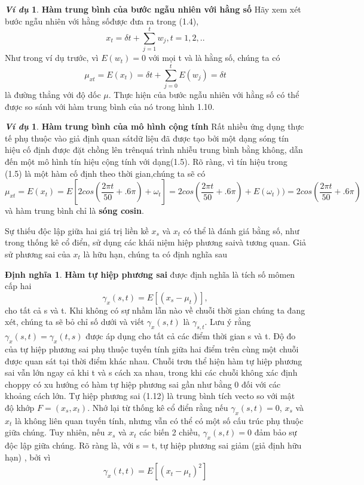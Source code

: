 \documentclass[12pt, a4paper,oneside]{book}
\theoremstyle{definition}
\newtheorem{dn}[theo]{Định nghĩa}
\newtheorem{vd}[theo]{\it Ví dụ}
\begin{document}
\begin{vd}\textbf {Hàm trung bình của bước ngẫu nhiên với hằng số}
	Hãy xem xét bước ngẫu nhiên với hằng sốđược đưa ra trong (1.4),
	$$ x_{t} = \delta t + \sum_{j=1}^{t} w_{j}, t= 1,2,..$$
	Như trong ví dụ trước, vì $E(w_{t}) = 0$ với mọi t và là hằng số, chúng ta có
	$$\mu_{xt} = E(x_{t}) = \delta t + \sum_{j=0}^{t} E (w_{j}) = \delta t$$
	là đường thẳng với độ dốc $\mu$. Thực hiện của bước ngẫu nhiên với hằng số có thể được so sánh với hàm trung bình của nó trong hình 1.10.
\end{vd}
\begin{vd}\textbf{Hàm trung bình của mô hình cộng tính}
	Rất nhiều ứng dụng thực tế phụ thuộc vào giả định quan sátdữ liệu đã được tạo bởi một dạng sóng tín hiệu cố định được đặt chồng lên trênquá trình nhiễu trung bình bằng không, dẫn đến một mô hình tín hiệu cộng tính với dạng(1.5). Rõ ràng, vì tín hiệu trong (1.5) là một hàm cố định theo thời gian,chúng ta sẽ có
	$$\mu_{xt} = E(x_{t}) = E [2cos(\dfrac{2\pi t}{50} + .6\pi) + \omega_{t}] = 2 cos(\dfrac{2\pi t}{50} +.6\pi) + E(\omega_{t})) = 2 cos (\dfrac{2\pi t}{50} + .6\pi)$$
	và hàm trung bình chỉ là \textbf{sóng cosin}.
\end{vd}
Sự thiếu độc lập giữa hai giá trị liền kề $x_{s}$ và $x_{t}$ có thể là đánh giá bằng số, như trong thống kê cổ điển, sử dụng các khái niệm hiệp phương saivà tương quan. Giả sử phương sai của $x_{t}$ là hữu hạn, chúng ta có định nghĩa sau
\begin{dn}\textbf{Hàm tự hiệp phương sai}
	được định nghĩa là tích số mômen cấp hai
	$$\gamma_{x}(s,t) = E [(x_{s} - \mu_{t})],$$
	cho tất cả s và t. Khi không có sự nhầm lẫn nào về chuỗi thời gian chúng ta đang xét, chúng ta sẽ bỏ chỉ số dưới và viết $\gamma_{x}(s,t)$ là $ \gamma_{s,t}.$
	Lưu ý rằng $\gamma_{x}(s,t) =\gamma_{x}(t,s)$ được áp dụng cho tất cả các điểm thời gian s và t. Độ đo của tự hiệp phương sai phụ thuộc tuyến tính giữa hai điểm trên cùng một chuỗi được quan sát tại thời điểm khác nhau. Chuỗi trơn thể hiện hàm tự hiệp phương sai vẫn lớn ngay cả khi t và s cách xa nhau, trong khi các chuỗi không xác định choppy có xu hướng có hàm tự hiệp phương sai  gần như bằng 0 đối với các khoảng cách lớn. Tự hiệp phương sai (1.12) là trung bình tích vecto so với mật độ khớp $F=(x_{s}, x_{t})$. Nhớ lại từ thống kê cổ điển rằng nếu $\gamma_{x} (s,t)= 0$, $x_{s}$ và $x_{t}$ là không liên quan tuyến tính, nhưng vẫn có thể có một số cấu trúc phụ thuộc giữa chúng. Tuy nhiên, nếu $x_{s}$ và $x_{t}$ các biến 2 chiều, $\gamma_{x}(s,t) = 0$ đảm bảo sự độc lập giữa chúng. Rõ ràng là, với s = t, tự hiệp phương sai giảm (giả định hữu hạn) , bởi vì
	$$\gamma_{x}(t,t) = E [(x_{t}- \mu_{t})^2]$$
\end{dn}
\end{document}
